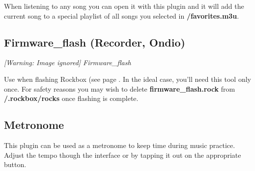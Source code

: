When listening to any song you can open it with this plugin and it will
add the current song to a special playlist of all songs you selected in
\textbf{/favorites.m3u}.

\subsection{Firmware\_flash (Recorder, Ondio)}
{\centering\mdseries\itshape
  [Warning: Image ignored] %
 \newline
Firmware\_flash
\par}

Use when flashing Rockbox (see page \pageref{ref:FlashingRockboxReal}.
In the ideal case, you'll need this tool only once. For safety reasons you may wish to delete \textbf{firmware\_flash.rock} from \textbf{/.rockbox/rocks} once flashing is complete.

\subsection{Metronome}
This plugin can be used as a metronome to keep time during music
practice.  Adjust the tempo though the interface or by tapping it out
on the appropriate button.

